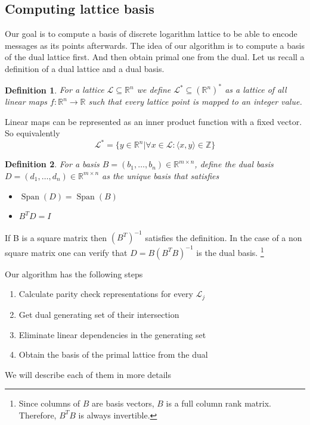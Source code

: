 \documentclass[12pt]{article}
\newcommand{\ZZ}{\mathbb{Z}}
\newcommand{\LL}{\mathcal{L}}
\DeclareMathOperator{\Span}{Span}
\newtheorem{definition}{Definition}
\begin{document}
\subsection{Computing lattice basis}
\label{subsec:compute_basis_integers}


Our goal is to compute a basis of discrete logarithm lattice to be able to encode messages as its points afterwards. The idea of our algorithm is to compute a basis of the dual lattice first. And then obtain primal one from the dual.
Let us recall a definition of a dual lattice and a dual basis.
\begin{definition}
    For a lattice $\LL \subseteq \mathbb{R}^{n}$ we define $\LL^{*} \subseteq (\mathbb{R}^{n})^{*}$ as a lattice of all linear maps $f:\mathbb{R}^{n} \rightarrow \mathbb{R}$ such that every lattice point is mapped to an integer value.
\end{definition}
Linear maps can be represented as an inner product function with a fixed vector. So equivalently
\[
    \LL^{*} = \{y \in \mathbb{R}^{n} | \forall x \in \LL:  \langle x,y\rangle \in \ZZ \}
\]

\begin{definition}
    For a basis $B = (b_{1}, \dots, b_{n}) \in \mathbb{R}^{m \times n}$, define the dual basis $D = (d_{1}, \dots, d_{n}) \in \mathbb{R}^{m \times n}$ as the unique basis that satisfies
    \begin{itemize}
        \item $\Span(D) = \Span(B)$
        \item $B^{T}D = I$
    \end{itemize}
\end{definition}
If B is a square matrix then $(B^{T})^{-1}$ satisfies the definition. In the case of a non square matrix one can verify that $D = B(B^{T}B)^{-1}$ is the dual basis. \footnote{Since columns of $B$ are basis vectors, $B$ is a full column rank matrix. Therefore, $B^{T}B$ is always invertible.}

 Our algorithm \label{algorithm} has the following steps
\begin{enumerate}
    \item \label{step1} Calculate parity check representations for every $\LL_{j}$
    \item \label{step2} Get dual generating set of their intersection
    \item \label{step3} Eliminate linear dependencies in the generating set
    \item \label{step4} Obtain the basis of the primal lattice from the dual
\end{enumerate}
We will describe each of them in more details
\end{document}
